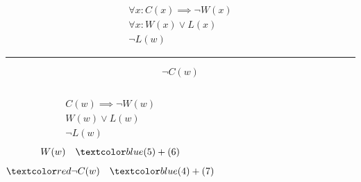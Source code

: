 \begin{frame}{}
  \begin{gather}
    \forall x: C(x) \implies \lnot W(x) \\[5pt]
    \forall x: W(x) \lor L(x) \\[5pt]
    \lnot L(w)
  \end{gather}
  
  \hrule
  \[
    \lnot C(w)
  \]

  \begin{columns}
      \pause
      \begin{gather}
	C(w) \implies \lnot W(w) \\[5pt]
	W(w) \lor L(w) \\[5pt]
	\lnot L(w)
      \end{gather}
      \pause
      \begin{gather}
	W(w) \quad \blue{(5) + (6)} \\[5pt]
	\red{\lnot C(w)} \quad \blue{(4) + (7)} 
      \end{gather}
  \end{columns}
\end{frame}

